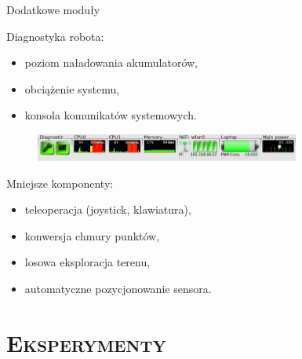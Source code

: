 \documentclass[xcolor=x11names,compress]{beamer}
\renewcommand{\(}{\begin{columns}}
\renewcommand{\)}{\end{columns}}
\newcommand{\<}[1]{\begin{column}{#1}}
\renewcommand{\>}{\end{column}}
\begin{document}
\begin{frame}{Dodatkowe moduły}

\alert{Diagnostyka robota:}
\begin{itemize}
\item poziom naładowania akumulatorów,
\item obciążenie systemu,
\item konsola komunikatów systemowych.
\end{itemize}

\begin{figure}[h!]
\centering
\includegraphics[width=8.7cm]{../Common/img/ros/elektron_dashboard}
\end{figure}

\alert{Mniejsze komponenty:}
\begin{itemize}
\item teleoperacja (joystick, klawiatura),
\item konwersja chmury punktów,
\item losowa eksploracja terenu,
\item automatyczne pozycjonowanie sensora.
\end{itemize}

\end{frame}

\section{\scshape Eksperymenty}

\end{document}
